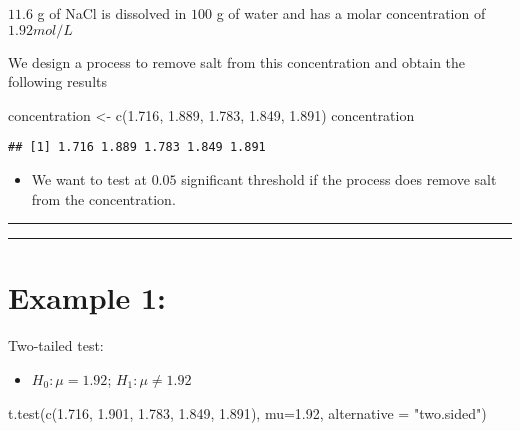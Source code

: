 \documentclass[
]{book}
\newenvironment{Shaded}{\begin{snugshade}}{\end{snugshade}}
\newcommand{\AttributeTok}[1]{\textcolor[rgb]{0.77,0.63,0.00}{#1}}
\newcommand{\FloatTok}[1]{\textcolor[rgb]{0.00,0.00,0.81}{#1}}
\newcommand{\FunctionTok}[1]{\textcolor[rgb]{0.00,0.00,0.00}{#1}}
\newcommand{\NormalTok}[1]{#1}
\newcommand{\OtherTok}[1]{\textcolor[rgb]{0.56,0.35,0.01}{#1}}
\newcommand{\StringTok}[1]{\textcolor[rgb]{0.31,0.60,0.02}{#1}}
\providecommand{\tightlist}{%
  \setlength{\itemsep}{0pt}\setlength{\parskip}{0pt}}
\begin{document}
\(11.6\) g of NaCl is dissolved in \(100\) g of water and has a molar concentration of \(1.92 mol/L\)

We design a process to remove salt from this concentration and obtain the following results

\begin{Shaded}
\begin{Highlighting}[]
\NormalTok{concentration }\OtherTok{\textless{}{-}} \FunctionTok{c}\NormalTok{(}\FloatTok{1.716}\NormalTok{, }\FloatTok{1.889}\NormalTok{, }\FloatTok{1.783}\NormalTok{, }\FloatTok{1.849}\NormalTok{, }\FloatTok{1.891}\NormalTok{)}
\NormalTok{concentration}
\end{Highlighting}
\end{Shaded}

\begin{verbatim}
## [1] 1.716 1.889 1.783 1.849 1.891
\end{verbatim}

\begin{itemize}
\tightlist
\item
  We want to test at \(0.05\) significant threshold if the process does remove salt from the concentration.
\end{itemize}

\begin{center}\rule{0.5\linewidth}{0.5pt}\end{center}

\begin{center}\rule{0.5\linewidth}{0.5pt}\end{center}

\hypertarget{example-1-5}{%
\section{Example 1:}\label{example-1-5}}

Two-tailed test:

\begin{itemize}
\tightlist
\item
  \(H_0:\mu=1.92\); \(H_1:\mu \neq 1.92\)
\end{itemize}

\begin{Shaded}
\begin{Highlighting}[]
\FunctionTok{t.test}\NormalTok{(}\FunctionTok{c}\NormalTok{(}\FloatTok{1.716}\NormalTok{, }\FloatTok{1.901}\NormalTok{, }\FloatTok{1.783}\NormalTok{, }\FloatTok{1.849}\NormalTok{, }\FloatTok{1.891}\NormalTok{), }
       \AttributeTok{mu=}\FloatTok{1.92}\NormalTok{, }\AttributeTok{alternative =} \StringTok{"two.sided"}\NormalTok{)}
\end{Highlighting}
\end{Shaded}
\end{document}
